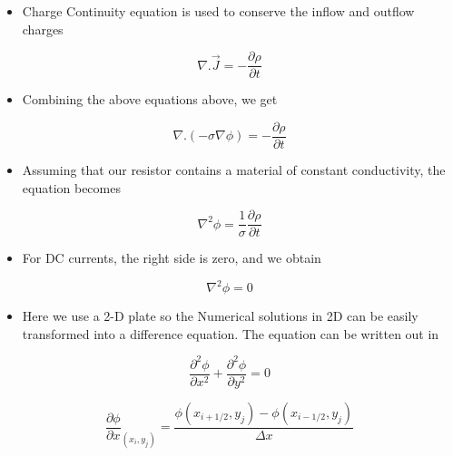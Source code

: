 \documentclass[a4paper,10pt]{article}
\providecommand{\tightlist}{%
      \setlength{\itemsep}{0pt}\setlength{\parskip}{0pt}}
\begin{document}
\begin{itemize}
\tightlist
\item
  Charge Continuity equation is used to conserve the inflow and outflow
  charges
\end{itemize}

\begin{equation}
\nabla.\vec{J} = -\frac{\partial \rho}{\partial t}
   \end{equation}

\begin{itemize}
\tightlist
\item
  Combining the above equations above, we get
\end{itemize}

\begin{equation}
\nabla.(-\sigma\nabla\phi) = -\frac{\partial \rho}{\partial t}
   \end{equation}

\begin{itemize}
\tightlist
\item
  Assuming that our resistor contains a material of constant
  conductivity, the equation becomes
\end{itemize}

\begin{equation}
\nabla^{2}\phi = \frac{1}{\sigma}\frac{\partial \rho}{\partial t}
   \end{equation}

\begin{itemize}
\tightlist
\item
  For DC currents, the right side is zero, and we obtain
\end{itemize}

\begin{equation}
\nabla^{2}\phi = 0
   \end{equation}

\begin{itemize}
\tightlist
\item
  Here we use a 2-D plate so the Numerical solutions in 2D can be easily
  transformed into a difference equation. The equation can be written
  out in
\end{itemize}

\begin{equation}
\frac{\partial^{2} \phi}{\partial x^{2}}+ \frac{\partial^{2} \phi}{\partial y^{2}} = 0
 \end{equation}

\begin{equation}
\frac{\partial \phi}{\partial x}_{(x_i,y_j)} = \frac{\phi(x_{i+1/2},y_j) - \phi(x_{i-1/2},y_j)}{\Delta x}
 \end{equation}
\end{document}
